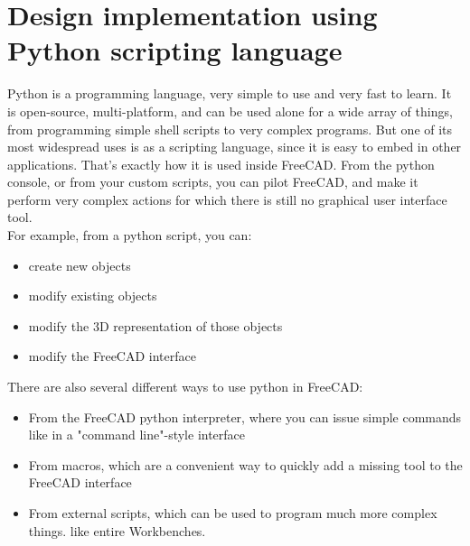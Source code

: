 \section{Design implementation using Python scripting language}
Python is a programming language, very simple to use and very fast to learn. 
It is open-source, multi-platform, and can be used alone for a wide array of 
things, from programming simple shell scripts to very complex programs. But 
one of its most widespread uses is as a scripting language, since it is easy 
to embed in other applications. That's exactly how it is used inside FreeCAD. 
From the python console, or from your custom scripts, you can pilot FreeCAD, 
and make it perform very complex actions for which there is still no graphical 
user interface tool.\\
For example, from a python script, you can:
\begin{itemize}
\item create new objects
\item modify existing objects
\item modify the 3D representation of those objects
\item modify the FreeCAD interface
\end{itemize}
There are also several different ways to use python in FreeCAD:
\begin{itemize}
\item From the FreeCAD python interpreter, where you can issue simple commands like in a "command line"-style interface
\item From macros, which are a convenient way to quickly add a missing tool to the FreeCAD interface
\item From external scripts, which can be used to program much more complex things. like entire Workbenches.
\end{itemize}
